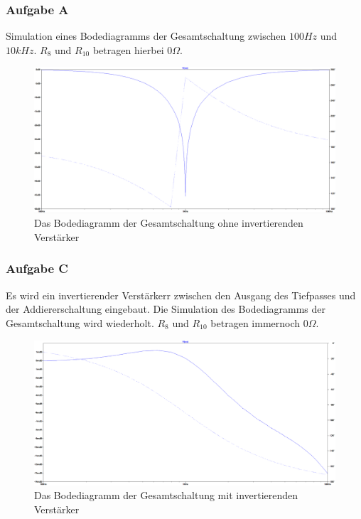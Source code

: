 \subsubsection{Aufgabe A}
Simulation eines Bodediagramms der Gesamtschaltung zwischen $\si{100}{Hz}$ und $\si{10}{kHz}$.
\newline $R_{8}$ und $R_{10}$ betragen hierbei $\si{0}{\Omega}$.
\begin{figure}[h]
\includegraphics[width=14cm]{pics/BodeAd_ohneInv}
\caption{Das Bodediagramm der Gesamtschaltung ohne invertierenden Verstärker}
\label{bodeA}
\end{figure}


\subsubsection{Aufgabe C}
Es wird ein invertierender Verstärkerr zwischen den Ausgang des Tiefpasses und der Addiererschaltung eingebaut. Die Simulation des Bodediagramms der Gesamtschaltung wird wiederholt. $R_{8}$ und $R_{10}$ betragen immernoch $\si{0}{\Omega}$.
\begin{figure}[h]
\includegraphics[width=14cm]{pics/BodeAd_mitInv}
\caption{Das Bodediagramm der Gesamtschaltung mit invertierenden Verstärker}
\label{bodeC}
\end{figure}

